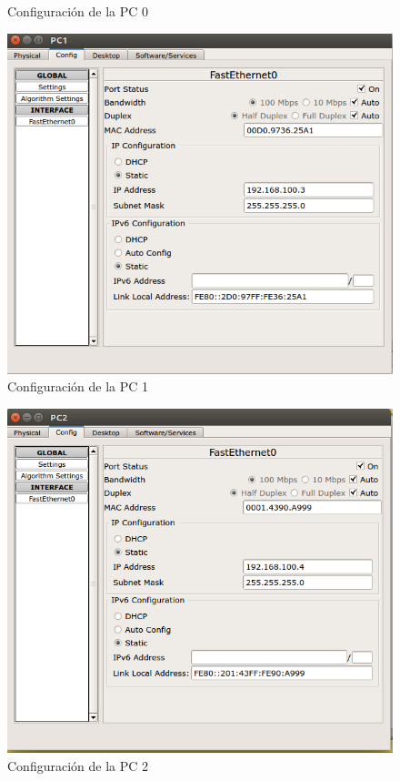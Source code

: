 \documentclass[a4paper,12pt]{article}
\begin{document}
\begin{enumerate}
\begin{figure}[H]
  \caption{Configuración de la PC 0}
 \end{figure}
 \begin{figure}[H]
  \centering
  \includegraphics[scale = 0.5]{3.png}
  \caption{Configuración de la PC 1}
 \end{figure}
 \begin{figure}[H]
  \centering
  \includegraphics[scale = 0.5]{4.png}
  \caption{Configuración de la PC 2}

\end{figure}
\end{enumerate}
\end{document}
